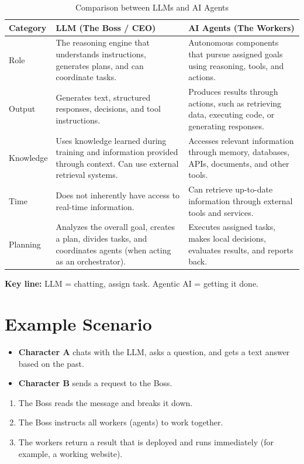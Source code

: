 \documentclass[a4paper,12pt]{report}
\begin{document}
\begin{table}[htbp]
\centering
\small
\begin{tabular}{|p{}|p{}|p{}|}
\hline
\textbf{Category} & \textbf{LLM (The Boss / CEO)} & \textbf{AI Agents (The Workers)} \\
\hline
Role & The reasoning engine that understands instructions, generates plans, and can coordinate tasks. & Autonomous components that pursue assigned goals using reasoning, tools, and actions. \\
\hline
Output & Generates text, structured responses, decisions, and tool instructions. & Produces results through actions, such as retrieving data, executing code, or generating responses. \\
\hline
Knowledge & Uses knowledge learned during training and information provided through context. Can use external retrieval systems. & Accesses relevant information through memory, databases, APIs, documents, and other tools. \\
\hline
Time & Does not inherently have access to real-time information. & Can retrieve up-to-date information through external tools and services. \\
\hline
Planning & Analyzes the overall goal, creates a plan, divides tasks, and coordinates agents (when acting as an orchestrator). & Executes assigned tasks, makes local decisions, evaluates results, and reports back. \\
\hline
\end{tabular}
\caption{Comparison between LLMs and AI Agents}
\label{tab:llm_agent_comparison}
\end{table}

\noindent\textbf{Key line:} LLM = chatting, assign task. Agentic AI = getting it done.

\section{Example Scenario}

\begin{itemize}
    \item \textbf{Character A} chats with the LLM, asks a question, and gets a text answer based on the past.
    \item \textbf{Character B} sends a request to the Boss.
\end{itemize}

\begin{enumerate}
    \item The Boss reads the message and breaks it down.
    \item The Boss instructs all workers (agents) to work together.
    \item The workers return a result that is deployed and runs immediately (for example, a working website).
\end{enumerate}
\end{document}
